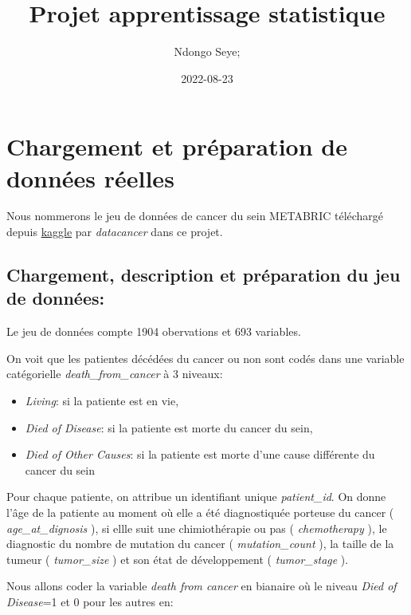 \documentclass[
  12pt,
]{article}
\title{Projet apprentissage statistique}
\author{Ndongo Seye;}
\date{2022-08-23}
\providecommand{\tightlist}{%
  \setlength{\itemsep}{0pt}\setlength{\parskip}{0pt}}
\begin{document}
\maketitle

\hypertarget{chargement-et-pruxe9paration-de-donnuxe9es-ruxe9elles}{%
\section{Chargement et préparation de données
réelles}\label{chargement-et-pruxe9paration-de-donnuxe9es-ruxe9elles}}

Nous nommerons le jeu de données de cancer du sein METABRIC téléchargé
depuis
\href{https://www.kaggle.com/raghadalharbi/breast-cancer-gene-expression-profiles-metabric}{kaggle}
par \emph{datacancer} dans ce projet.

\hypertarget{chargement-description-et-pruxe9paration-du-jeu-de-donnuxe9es}{%
\subsection{Chargement, description et préparation du jeu de
données:}\label{chargement-description-et-pruxe9paration-du-jeu-de-donnuxe9es}}

Le jeu de données compte 1904 obervations et 693 variables.

On voit que les patientes décédées du cancer ou non sont codés dans une
variable catégorielle \emph{death\_from\_cancer} à 3 niveaux:

\begin{itemize}
\tightlist
\item
  \emph{Living}: si la patiente est en vie,
\item
  \emph{Died of Disease}: si la patiente est morte du cancer du sein,
\item
  \emph{Died of Other Causes}: si la patiente est morte d'une cause
  différente du cancer du sein
\end{itemize}

Pour chaque patiente, on attribue un identifiant unique
\emph{patient\_id}. On donne l'âge de la patiente au moment où elle a
été diagnostiquée porteuse du cancer ( \emph{age\_at\_dignosis} ), si
ellle suit une chimiothérapie ou pas ( \emph{chemotherapy} ), le
diagnostic du nombre de mutation du cancer ( \emph{mutation\_count} ),
la taille de la tumeur ( \emph{tumor\_size} ) et son état de
développement ( \emph{tumor\_stage} ).

Nous allons coder la variable \emph{death from cancer} en bianaire où le
niveau \emph{Died of Disease}=1 et 0 pour les autres en:
\end{document}

